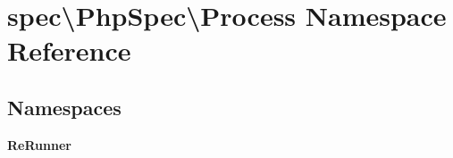 \section{spec\textbackslash{}Php\+Spec\textbackslash{}Process Namespace Reference}
\label{namespacespec_1_1_php_spec_1_1_process}
\subsection*{Namespaces}
\begin{DoxyCompactItemize}
\item 
 {\bf Re\+Runner}
\end{DoxyCompactItemize}
